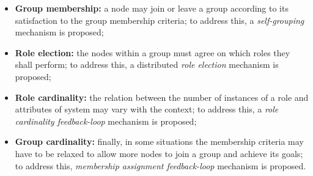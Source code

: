 


%	
%	
%	


\begin{itemize}
	
	\item \textbf{Group membership:} a node may join or leave a group according to its satisfaction to the group membership criteria; to address this, a \textit{self-grouping} mechanism is proposed;
	
	\item \textbf{Role election:} the nodes within a group must agree on which roles they shall perform; to address this, a distributed \textit{role election} mechanism is proposed;
	
	\item \textbf{Role cardinality:} the relation between the number of instances of a role and attributes of system may vary with the context; to address this, a \textit{role cardinality feedback-loop}  mechanism is proposed;
	
	\item \textbf{Group cardinality:} finally, in some situations the membership criteria may have to be relaxed to allow more nodes to join a group and achieve its goals; to address this, \textit{membership assignment feedback-loop} mechanism is proposed.
	
\end{itemize}

